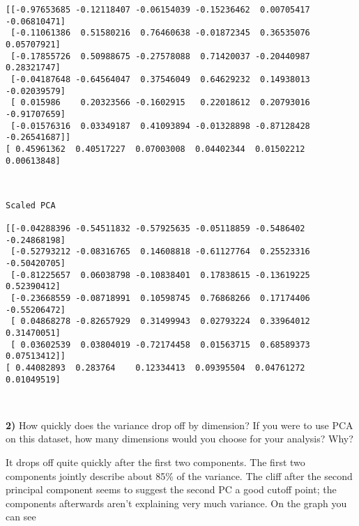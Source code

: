 \documentclass{article}
\begin{document}
    \begin{Verbatim}[commandchars=\\\{\}]
[[-0.97653685 -0.12118407 -0.06154039 -0.15236462  0.00705417 -0.06810471]
 [-0.11061386  0.51580216  0.76460638 -0.01872345  0.36535076  0.05707921]
 [-0.17855726  0.50988675 -0.27578088  0.71420037 -0.20440987  0.28321747]
 [-0.04187648 -0.64564047  0.37546049  0.64629232  0.14938013 -0.02039579]
 [ 0.015986    0.20323566 -0.1602915   0.22018612  0.20793016 -0.91707659]
 [-0.01576316  0.03349187  0.41093894 -0.01328898 -0.87128428 -0.26541687]]
[ 0.45961362  0.40517227  0.07003008  0.04402344  0.01502212  0.00613848]
    \end{Verbatim}

    \begin{center}
    \end{center}
    { \hspace*{\fill} \\}
    
    \begin{Verbatim}[commandchars=\\\{\}]
Scaled PCA

[[-0.04288396 -0.54511832 -0.57925635 -0.05118859 -0.5486402  -0.24868198]
 [-0.52793212 -0.08316765  0.14608818 -0.61127764  0.25523316 -0.50420705]
 [-0.81225657  0.06038798 -0.10838401  0.17838615 -0.13619225  0.52390412]
 [-0.23668559 -0.08718991  0.10598745  0.76868266  0.17174406 -0.55206472]
 [ 0.04868278 -0.82657929  0.31499943  0.02793224  0.33964012  0.31470051]
 [ 0.03602539  0.03804019 -0.72174458  0.01563715  0.68589373  0.07513412]]
[ 0.44082893  0.283764    0.12334413  0.09395504  0.04761272  0.01049519]
    \end{Verbatim}

    \begin{center}
    \end{center}
    { \hspace*{\fill} \\}
    
    \textbf{2)} How quickly does the variance drop off by dimension? If you
were to use PCA on this dataset, how many dimensions would you choose
for your analysis? Why?

    It drops off quite quickly after the first two components. The first two
components jointly describe about 85\% of the variance. The cliff after
the second principal component seems to suggest the second PC a good
cutoff point; the components afterwards aren't explaining very much
variance. On the graph you can see
\end{document}
